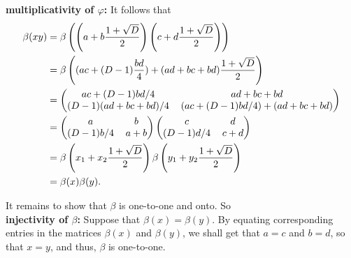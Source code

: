\begin{enumerate}
\begin{enumerate}
               \textbf{multiplicativity of $\varphi$:} It follows that
               \begin{align*}
                  \beta(xy) &= \beta\left(\left(a + b
                     \frac{1 + \sqrt{D}}{2}\right)
                     \left(c + d \frac{1 + \sqrt{D}}{2}\right)\right) \\
                     &= \beta\left((ac + (D-1)\frac{bd}{4}) + (ad + bc + bd)
                     \frac{1 + \sqrt{D}}{2}\right) \\
                     &= \left(\begin{tabular}{@{}cc@{}}
                        $ac + (D-1)bd/4$ & $ad + bc + bd$ \\
                        $(D-1)(ad + bc + bd)/4$  & $(ac + (D-1)bd/4)+
                         (ad + bc + bd)$
                     \end{tabular}\right) \\
                     &= \left(\begin{tabular}{@{}cc@{}}
                        $a$ & $b$ \\
                        $(D-1)b/4$  & $a + b$
                     \end{tabular}\right)\left(\begin{tabular}{@{}cc@{}}
                        $c$ & $d$ \\
                        $(D-1)d/4$  & $c+d$
                     \end{tabular}\right) \\
                     &= \beta\left(x_1 + x_2\frac{1 + \sqrt{D}}{2}\right)
                        \beta\left(y_1 + y_2\frac{1 + \sqrt{D}}{2}\right) \\
                     &= \beta(x)\beta(y).
               \end{align*}

               It remains to show that $\beta$ is one-to-one and onto. So \\

               \textbf{injectivity of $\beta$:} Suppose that
               $\beta(x) = \beta(y)$. By equating corresponding entries in the
               matrices $\beta(x)$ and $\beta(y)$, we shall get that $a = c$ and
               $b = d$, so that $x = y$, and thus, $\beta$ is one-to-one. \\


\end{enumerate}
\end{enumerate}
